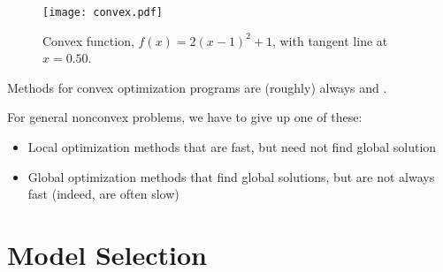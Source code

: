 \documentclass[10pt]{article}
\begin{document}
	
	\begin{figure}[h]
	\centering
	\texttt{[image: convex.pdf]}
	\caption{Convex function, $f(x) = 2(x-1)^2 + 1$, with tangent line at $x = 0.50$.}
	\label{convex}
	\end{figure}
	
	Methods  for convex optimization programs are (roughly) always  and .
	
For general nonconvex problems, we have to give up one of these:
	\begin{itemize}
	\item Local optimization methods that are fast, but need not find global solution
	\item Global optimization methods that find global solutions, but
are not always fast (indeed, are often slow)
	\end{itemize}

	

\section{Model Selection}
\end{document}
